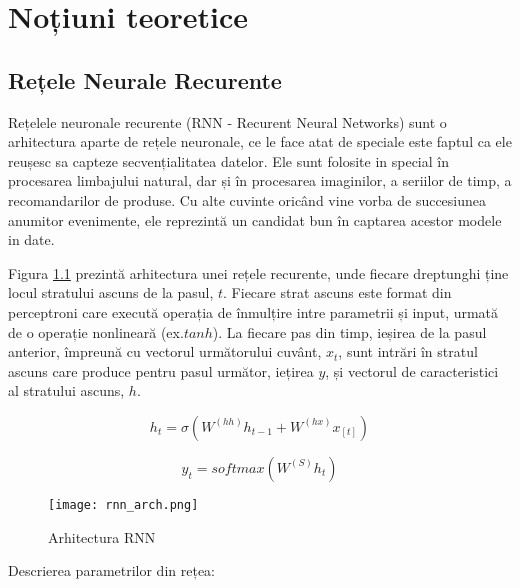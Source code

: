 \chapter{Noțiuni teoretice}

\section{Rețele Neurale Recurente}

Rețelele neuronale recurente (RNN - Recurent Neural Networks) sunt o arhitectura aparte de rețele neuronale, ce le face atat de speciale este faptul ca ele reușesc sa capteze secvențialitatea datelor. Ele sunt folosite in special în procesarea limbajului natural, dar și în procesarea imaginilor, a seriilor de timp, a recomandarilor de produse. Cu alte cuvinte oricând vine vorba de succesiunea anumitor evenimente, ele reprezintă un candidat bun în captarea acestor modele in date.

Figura \ref{fig:rnn_arch} prezintă arhitectura unei rețele recurente, unde fiecare dreptunghi ține locul stratului ascuns de la pasul, $t$. Fiecare strat ascuns este format din perceptroni care execută operația de înmulțire intre parametrii și input, urmată de o operație nonlineară (ex.$ tanh$). La fiecare pas din timp, ieșirea de la pasul anterior, împreună cu vectorul următorului cuvânt, $x_t$, sunt intrări în stratul ascuns care produce pentru pasul următor, iețirea $y$, și vectorul de caracteristici al stratului ascuns, $h$.


\begin{equation}
	h_t = \sigma{(W^{(hh)} h_{t-1} + W^{(hx)} x_{[t]})}
	\label{h_t}
\end{equation}

\begin{equation}
	y_t = softmax(W^{(S)} h_t) 
	\label{y_t}
\end{equation}

\begin{figure}[h]
	\centering
	\texttt{[image: rnn\_arch.png]}
	\caption{Arhitectura RNN \cite{cs224d_notes}}
	\label{fig:rnn_arch}
\end{figure}

Descrierea parametrilor din rețea:

